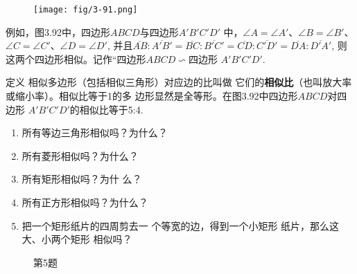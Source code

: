 \begin{figure}[htp]
    \centering
\texttt{[image: fig/3-91.png]}
    \caption{}
\end{figure}

\begin{figure}[htp]
    \centering
    \caption{}
\end{figure}

例如，图3.92中，四边形$ABCD$与四边形$A'B'C'D'$
中，$\angle A=\angle A'$、$\angle B=\angle B'$、$\angle C=\angle C'$、$\angle D=\angle D'$, 
并且$\overline{AB}:\overline{A'B'}=\overline{BC}:\overline{B'C'}=\overline{CD}:\overline{C'D'}=\overline{DA}:\overline{D'A'}$, 则
这两个四边形相似。记作“四边形$ABCD\backsim$四边形
$A'B'C'D'$. 

\begin{blk}
    {定义} 相似多边形（包括相似三角形）对应边的比叫做
它们的\textbf{相似比}（也叫放大率或缩小率）。相似比等于1的多
边形显然是全等形。在图3.92中四边形$ABCD$对四边形
$A'B'C'D'$的相似比等于5:4.
\end{blk}

\begin{ex}
\begin{enumerate}
    \item 所有等边三角形相似吗？为什么？
    \item 所有菱形相似吗？为什么？
    \item 所有矩形相似吗？为什
    么？
    \item 所有正方形相似吗？为什么？
    \item 把一个矩形纸片的四周剪去一
    个等宽的边，得到一个小矩形
    纸片，那么这大、小两个矩形
    相似吗？
\end{enumerate}
\end{ex}

\begin{figure}[htp]
    \centering
{}
    \caption*{第5题}
\end{figure}

